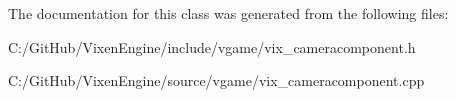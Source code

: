 The documentation for this class was generated from the following files\+:\begin{DoxyCompactItemize}
\item 
C\+:/\+Git\+Hub/\+Vixen\+Engine/include/vgame/vix\+\_\+cameracomponent.\+h\item 
C\+:/\+Git\+Hub/\+Vixen\+Engine/source/vgame/vix\+\_\+cameracomponent.\+cpp\end{DoxyCompactItemize}
